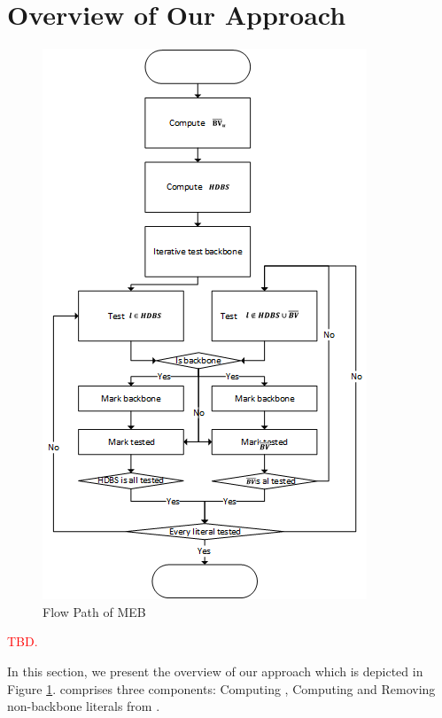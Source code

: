 \section{Overview of Our Approach}\label{sec:walg}
\begin{figure}
    \centering
    \includegraphics[scale=0.5]{flow.png}
   \caption{Flow Path of MEB}
   \label{fig:flow}
\end{figure}
\textcolor{red}{TBD.}

In this section, we present the overview of our approach \tool which is depicted in Figure
\ref{fig:flow}. \tool comprises three components: Computing \NB, Computing \HBL and Removing non-backbone literals from \HBL.


